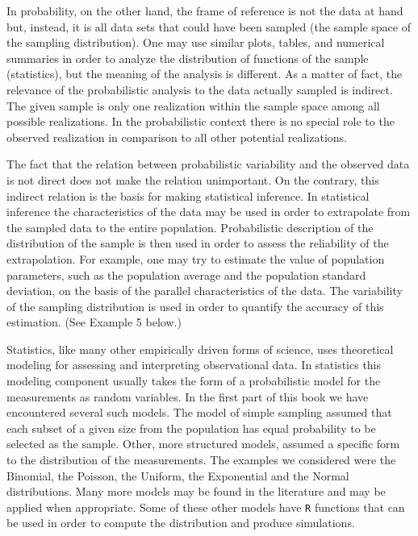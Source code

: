 \documentclass[]{krantz}
\theoremstyle{definition}
\theoremstyle{definition}
\theoremstyle{definition}
\theoremstyle{remark}
\begin{document}
In probability, on the other hand, the frame of reference is not the
data at hand but, instead, it is all data sets that could have been
sampled (the sample space of the sampling distribution). One may use
similar plots, tables, and numerical summaries in order to analyze the
distribution of functions of the sample (statistics), but the meaning of
the analysis is different. As a matter of fact, the relevance of the
probabilistic analysis to the data actually sampled is indirect. The
given sample is only one realization within the sample space among all
possible realizations. In the probabilistic context there is no special
role to the observed realization in comparison to all other potential
realizations.

The fact that the relation between probabilistic variability and the
observed data is not direct does not make the relation unimportant. On
the contrary, this indirect relation is the basis for making statistical
inference. In statistical inference the characteristics of the data may
be used in order to extrapolate from the sampled data to the entire
population. Probabilistic description of the distribution of the sample
is then used in order to assess the reliability of the extrapolation.
For example, one may try to estimate the value of population parameters,
such as the population average and the population standard deviation, on
the basis of the parallel characteristics of the data. The variability
of the sampling distribution is used in order to quantify the accuracy
of this estimation. (See Example 5 below.)

Statistics, like many other empirically driven forms of science, uses
theoretical modeling for assessing and interpreting observational data.
In statistics this modeling component usually takes the form of a
probabilistic model for the measurements as random variables. In the
first part of this book we have encountered several such models. The
model of simple sampling assumed that each subset of a given size from
the population has equal probability to be selected as the sample.
Other, more structured models, assumed a specific form to the
distribution of the measurements. The examples we considered were the
Binomial, the Poisson, the Uniform, the Exponential and the Normal
distributions. Many more models may be found in the literature and may
be applied when appropriate. Some of these other models have \texttt{R}
functions that can be used in order to compute the distribution and
produce simulations.
\end{document}
